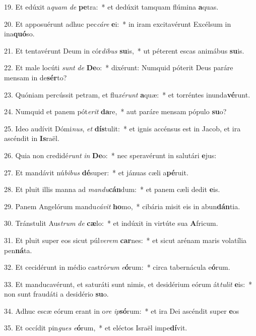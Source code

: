 19. Et edúxit a\textit{quam} \textit{de} \textbf{pe}tra:~*  et dedúxit tamquam flúmina \textbf{a}quas.\

20. Et apposuérunt adhuc pec\textit{cá}\textit{re} \textbf{e}i:~*  in iram excitavérunt Excélsum in ina\textbf{quó}so.\

21. Et tentavérunt Deum in cór\textit{di}\textit{bus} \textbf{su}is,~*  ut péterent escas animábus \textbf{su}is.\

22. Et male locúti \textit{sunt} \textit{de} \textbf{De}o:~*  dixérunt: Numquid póterit Deus paráre mensam in de\textbf{sér}to?\

23. Quóniam percússit petram, et flu\textit{xé}\textit{runt} \textbf{a}quæ:~*  et torréntes inunda\textbf{vé}runt.\

24. Numquid et panem pót\textit{e}\textit{rit} \textbf{da}re,~*  aut paráre mensam pópulo \textbf{su}o?\

25. Ideo audívit Dómi\textit{nus}, \textit{et} \textbf{dís}tulit:~*  et ignis accénsus est in Jacob, et ira ascéndit in \textbf{Is}raël.\

26. Quia non credidé\textit{runt} \textit{in} \textbf{De}o:~*  nec speravérunt in salutári \textbf{e}jus:\

27. Et mandávit nú\textit{bi}\textit{bus} \textbf{dé}super:~*  et jánuas cæli a\textbf{pé}ruit.\

28. Et pluit illis manna ad \textit{man}\textit{du}\textbf{cán}dum:~*  et panem cæli dedit \textbf{e}is.\

29. Panem Angelórum mandu\textit{cá}\textit{vit} \textbf{ho}mo,~*  cibária misit eis in abun\textbf{dán}tia.\

30. Tránstulit Aus\textit{trum} \textit{de} \textbf{cæ}lo:~*  et indúxit in virtúte sua \textbf{A}fricum.\

31. Et pluit super eos sicut púl\textit{ve}\textit{rem} \textbf{car}nes:~*  et sicut arénam maris volatília pen\textbf{ná}ta.\

32. Et cecidérunt in médio castró\textit{rum} \textit{e}\textbf{ó}rum:~*  circa tabernácula e\textbf{ó}rum.\

33. Et manducavérunt, et saturáti sunt nimis, et desidérium eórum át\textit{tu}\textit{lit} \textbf{e}is:~*  non sunt fraudáti a desidério \textbf{su}o.\

34. Adhuc escæ eórum erant in o\textit{re} \textit{ip}\textbf{só}rum:~*  et ira Dei ascéndit super \textbf{e}os\

35. Et occídit pin\textit{gues} \textit{e}\textbf{ó}rum,~*  et eléctos Israël impe\textbf{dí}vit.\

